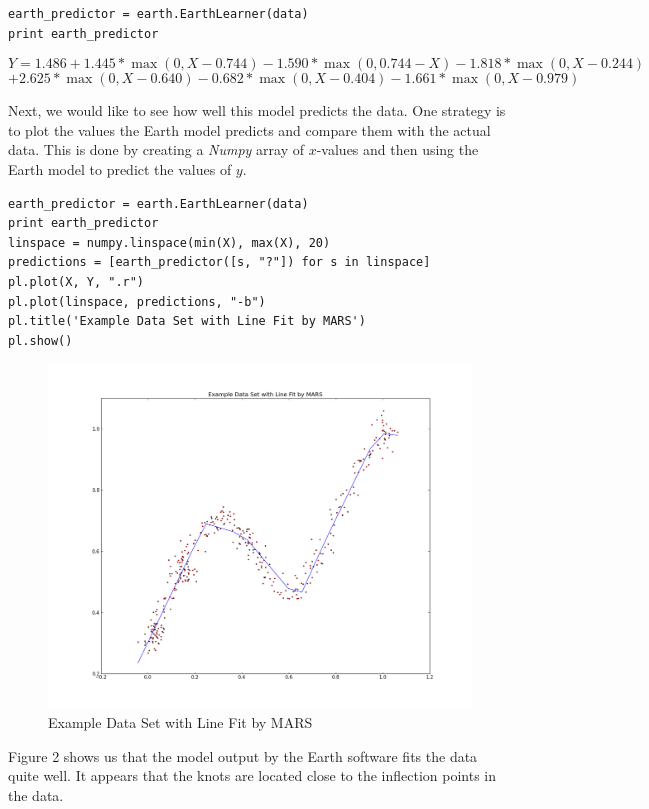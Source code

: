 \begin{lstlisting}[caption={Fit the Data},label=3rd,firstnumber=27]
earth_predictor = earth.EarthLearner(data)
print earth_predictor

\end{lstlisting}

\begin{equation}
	Y =   1.486   +1.445 * \max (0, X - 0.744)   -1.590 * \max (0, 0.744 - X)   -1.818 * \max (0, X - 0.244)
\end{equation}
\begin{equation}
\nonumber
	+2.625 * \max (0, X - 0.640)   -0.682 * \max (0, X - 0.404)   -1.661 * \max (0, X - 0.979)
\end{equation}


Next, we would like to see how well this model predicts the data. One strategy is to plot the values the Earth model predicts and compare them with the actual data. This is done by creating a \emph{Numpy} array of $x$-values and then using the Earth model to predict the values of $y$.

\begin{lstlisting}[caption={Compare the Predicted vs Actual Values and Plot the Results},label=2nd,firstnumber=29]
earth_predictor = earth.EarthLearner(data)
print earth_predictor
linspace = numpy.linspace(min(X), max(X), 20)
predictions = [earth_predictor([s, "?"]) for s in linspace]
pl.plot(X, Y, ".r")
pl.plot(linspace, predictions, "-b")
pl.title('Example Data Set with Line Fit by MARS')
pl.show()
\end{lstlisting}

\begin{figure}[H]
    \centering
       \includegraphics[width=6.5in]{example_data_fit.png}
    \caption{Example Data Set with Line Fit by MARS}
    \label{Example Data}
\end{figure}

Figure 2 shows us that the model output by the Earth software fits the data quite well. It appears that the knots are located close to the inflection points in the data.






